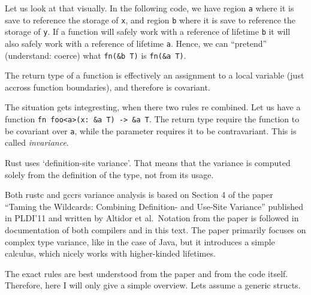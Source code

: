 Let us look at that visually. In the following code, we have region
\texttt{\textquotesingle{}a} where it is save to reference the storage
of \texttt{x}, and region \texttt{\textquotesingle{}b} where it is save
to reference the storage of \texttt{y}. If a function will safely work
with a reference of lifetime \texttt{\textquotesingle{}b} it will also
safely work with a reference of lifetime \texttt{\textquotesingle{}a}.
Hence, we can ``pretend'' (understand: coerce) what
\texttt{fn(\&\textquotesingle{}b\ T)} is
\texttt{fn(\&\textquotesingle{}a\ T)}.

\begin{Shaded}
\begin{Highlighting}[]
\OperatorTok{=} \OperatorTok{;}        \OperatorTok{|}
\OperatorTok{\{}                 \OperatorTok{|}
    \OperatorTok{=} \OperatorTok{;}    \OperatorTok{|}             \OperatorTok{|}          
\OperatorTok{\}}                 \OperatorTok{|}
\end{Highlighting}
\end{Shaded}

The return type of a function is effectively an assignment to a local
variable (just accross function boundaries), and therefore is covariant.

The situation gets integresting, when there two rules re combined. Let
us have a function
\texttt{fn\ foo\textless{}\textquotesingle{}a\textgreater{}(x:\ \&\textquotesingle{}a\ T)\ -\textgreater{}\ \&\textquotesingle{}a\ T}.
The return type require the function to be covariant over
\texttt{\textquotesingle{}a}, while the parameter requires it to be
contravariant. This is called \emph{invariance}.

Rust uses `definition-site variance'. That means that the variance is
computed solely from the definition of the type, not from its usage.

Both rustc and gccrs variance analysis is based on Section 4 of the
paper ``Taming the Wildcards: Combining Definition- and Use-Site
Variance'' published in PLDI'11 and written by Altidor et al.~Notation
from the paper is followed in documentation of both compilers and in
this text. The paper primarily focuses on complex type variance, like in
the case of Java, but it introduces a simple calculus, which nicely
works with higher-kinded lifetimes.

The exact rules are best understood from the paper and from the code
itself. Therefore, here I will only give a simple overview. Lets assume
a generic structs.

